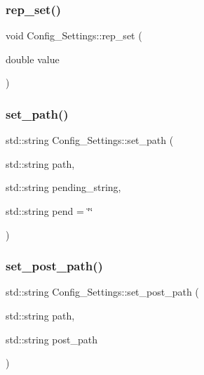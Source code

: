 \subsubsection{\texorpdfstring{rep\+\_\+set()}{rep\_set()}}
{\footnotesize\ttfamily void Config\+\_\+\+Settings\+::rep\+\_\+set (\begin{DoxyParamCaption}\item[{double}]{value }\end{DoxyParamCaption})}

\mbox{\label{class_config___settings_a4d2c6e8c21b58d66491e90a0e04713dd}} 
\subsubsection{\texorpdfstring{set\+\_\+path()}{set\_path()}}
{\footnotesize\ttfamily std\+::string Config\+\_\+\+Settings\+::set\+\_\+path (\begin{DoxyParamCaption}\item[{std\+::string}]{path,  }\item[{std\+::string}]{pending\+\_\+string,  }\item[{std\+::string}]{pend = {\ttfamily \char`\"{}\char`\"{}} }\end{DoxyParamCaption})\hspace{0.3cm}{\ttfamily [private]}}

\mbox{\label{class_config___settings_a194d4bf62b0395b7f743c3101de5983b}} 
\subsubsection{\texorpdfstring{set\+\_\+post\+\_\+path()}{set\_post\_path()}}
{\footnotesize\ttfamily std\+::string Config\+\_\+\+Settings\+::set\+\_\+post\+\_\+path (\begin{DoxyParamCaption}\item[{std\+::string}]{path,  }\item[{std\+::string}]{post\+\_\+path }\end{DoxyParamCaption})\hspace{0.3cm}{\ttfamily [private]}}

